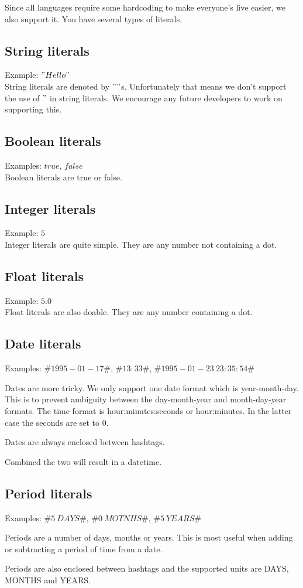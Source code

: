 Since all languages require some hardcoding to make everyone's live easier, we also support it. You have several types of literals.

\subsection{String literals}
Example: $"Hello"$ \\
String literals are denoted by $""$s. Unfortunately that means we don't support the use of $"$ in string literals. We encourage any future developers to work on supporting this.

\subsection{Boolean literals}
Examples: $true$, $false$ \\
Boolean literals are true or false.

\subsection{Integer literals}
Example: $5$ \\
Integer literals are quite simple. They are any number not containing a dot.

\subsection{Float literals}
Example: $5.0$ \\
Float literals are also doable. They are any number containing a dot.

\subsection{Date literals}
Examples: $\#1995-01-17\#$, $\#13:33\#$, $\#1995-01-23\ 23:35:54\#$

Dates are more tricky. We only support one date format which is year-month-day. This is to prevent ambiguity between the day-month-year and month-day-year formats. The time format is hour:minutes:seconds or hour:minutes. In the latter case the seconds are set to 0.

Dates are always enclosed between hashtags.

Combined the two will result in a datetime.

\subsection{Period literals}
Examples: $\#5\ DAYS\#$, $\#0\ MOTNHS\#$, $\#5\ YEARS\#$

Periods are a number of days, months or years. This is most useful when adding or subtracting a period of time from a date.

Periods are also enclosed between hashtags and the supported units are DAYS, MONTHS and YEARS.